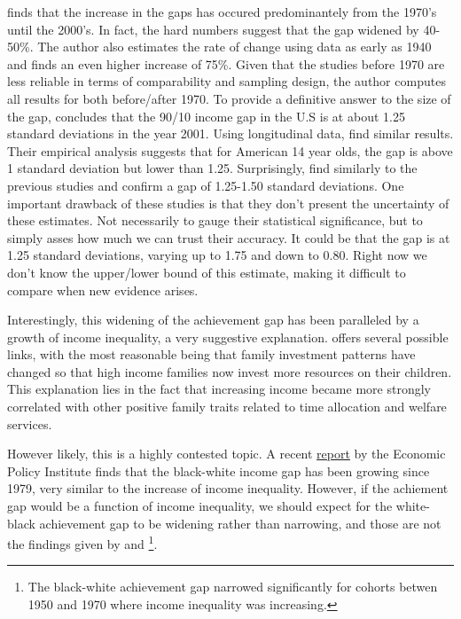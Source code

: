 \documentclass[11pt, a4paper]{article}\usepackage[]{graphicx}\usepackage[]{color}
\begin{document}
\citet{reardon2011} finds that the increase in the gaps has occured predominantely from the 1970's until the 2000's. In fact, the hard numbers suggest that the gap widened by 40-50\%. The author also estimates the rate of change using data as early as 1940 and finds an even higher increase of   75\%. Given that the studies before 1970 are less reliable in terms of comparability and sampling design, the author computes all results for both before/after 1970. To provide a definitive answer to the size of the gap, \citet{reardon2011} concludes that the 90/10 income gap in the U.S is at about 1.25 standard deviations in the year 2001. Using longitudinal data, \citet{bradbury2015} find similar results. Their empirical analysis suggests that for American 14 year olds, the gap is above 1 standard deviation but lower than 1.25. Surprisingly, \citet{duncan2011} find similarly to the previous studies and confirm a gap of  1.25-1.50 standard deviations. One important drawback of these studies is that they don't present the uncertainty of these estimates. Not necessarily to gauge their statistical significance, but to simply asses how much we can trust their accuracy. It could be that the gap is at  1.25 standard deviations, varying up to 1.75 and down to 0.80. Right now we don't know the upper/lower bound of this estimate, making it difficult to compare when new evidence arises.

Interestingly, this widening of the achievement gap has been paralleled by a growth of income inequality, a very suggestive explanation. \citet{reardon2011} offers several possible links, with the most reasonable being that family investment patterns have changed so that high income families now invest more resources on their children. This explanation lies in the fact that increasing income became more strongly correlated with other positive family traits related to time allocation and welfare services.

However likely, this is a highly contested topic. A recent \href{http://www.epi.org/files/pdf/101972.pdf}{report} by the Economic Policy Institute finds that the black-white income gap has been growing since 1979, very similar to the increase of income inequality. However, if the achiement gap would be a function of income inequality, we should expect for the white-black achievement gap to be widening rather than narrowing, and those are not the findings given by \citet{reardon2011} and \citet{magnuson2008} \footnote{The black-white achievement gap narrowed significantly for cohorts betwen 1950 and 1970 where income inequality was increasing.}.
\end{document}
